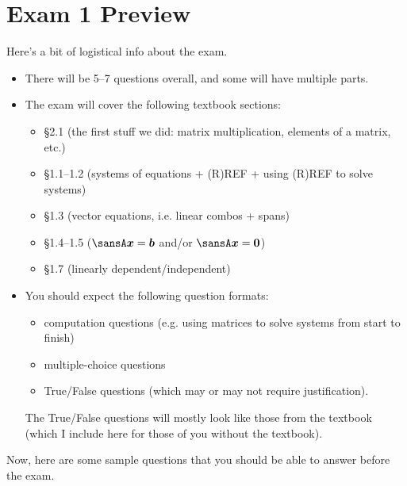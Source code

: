 \documentclass[12pt]{article}
\theoremstyle{definition}
\theoremstyle{underl}
\begin{document}
	\section*{\centering Exam 1 Preview}
	
	\noindent Here's a bit of logistical info about the exam.
	\begin{itemize}[topsep=0.125in,itemsep=0.625mm]
		\item There will be 5--7 questions overall, and some will have multiple parts.
		\item The exam will cover the following textbook sections: 
		\begin{itemize}[topsep=0mm]
			\item \S2.1 (the first stuff we did: matrix multiplication, elements of a matrix, etc.)
			\item \S1.1--1.2 (systems of equations + (R)REF + using (R)REF to solve systems) 
			\item \S1.3 (vector equations, i.e. linear combos + spans)
			\item \S1.4--1.5 ($\sansA\vect{x}=\vect{b}$ and/or $\sansA\vect{x}=\vect{0}$)
			\item \S1.7 (linearly dependent/independent)
		\end{itemize}
		\item You should expect the following question formats:
		\begin{itemize}[topsep=0mm]
			\item computation questions (e.g. using matrices to solve systems from start to finish)
			\item multiple-choice questions
			\item True/False questions (which may or may not require justification).
		\end{itemize}
		The True/False questions will mostly look like those from the textbook (which I include here for those of you without the textbook).
	\end{itemize}
	
	\newpage
	
	\noindent Now, here are some sample questions that you should be able to answer before the exam.
	
\end{document}
